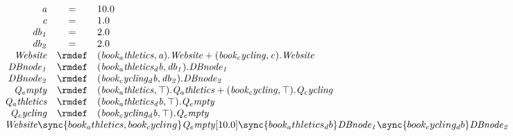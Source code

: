 \begin{displaymath}
	\begin{array}{rcl}
		\mathit{a} & = & 10.0\\
		\mathit{c} & = & 1.0\\
		\mathit{db_1} & = & 2.0\\
		\mathit{db_2} & = & 2.0\\
[0.0ex]		\mathit{Website} & \rmdef & (\mathit{book_athletics},\mathit{a}).\mathit{Website}+(\mathit{book_cycling},\mathit{c}).\mathit{Website}\\
		\mathit{DBnode_1} & \rmdef & (\mathit{book_athletics_db},\mathit{db_1}).\mathit{DBnode_1}\\
		\mathit{DBnode_2} & \rmdef & (\mathit{book_cycling_db},\mathit{db_2}).\mathit{DBnode_2}\\
		\mathit{Q_empty} & \rmdef & (\mathit{book_athletics},\top).\mathit{Q_athletics}+(\mathit{book_cycling},\top).\mathit{Q_cycling}\\
		\mathit{Q_athletics} & \rmdef & (\mathit{book_athletics_db},\top).\mathit{Q_empty}\\
		\mathit{Q_cycling} & \rmdef & (\mathit{book_cycling_db},\top).\mathit{Q_empty}\\
[0.0ex]		\multicolumn{3}{l}{\mathit{Website}\sync{book_athletics,book_cycling}\mathit{Q_empty}[10.0]\sync{book_athletics_db}\mathit{DBnode_1}\sync{book_cycling_db}\mathit{DBnode_2}}\\
[0.0ex]	\end{array}
\end{displaymath}
